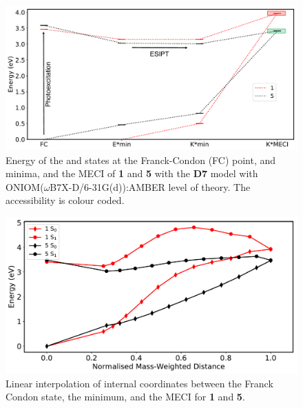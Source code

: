 \begin{figure}[t]
\centering
  \includegraphics[width=0.8\linewidth]{4IntraInterInteractions/D7.pdf}
  \caption[Decay mechanism in the molecular crystal in \textbf{D7} model]{Energy of the \szero{} and \sone{} states at the  Franck-Condon (FC) point, \Estar{} and \Kstar{} minima, and the MECI of \textbf{1} and \textbf{5} with the \textbf{D7} model with ONIOM($\omega$B7X-D/6-31G(d)):AMBER level of theory. The accessibility is colour coded.}
  \label{figure: Solid_Mechanism_D7}
\end{figure}

\begin{figure}[t]
\centering
  \includegraphics[width=0.8\linewidth]{4IntraInterInteractions/ONIOM_LIIC.pdf}
  \caption[Linear interpolation of internal coordinates in the solid state]{Linear interpolation of internal coordinates between the Franck Condon state, the \sone{} minimum, and the MECI for \textbf{1} and \textbf{5}.}
  \label{figure: solid_liic}
\end{figure}

